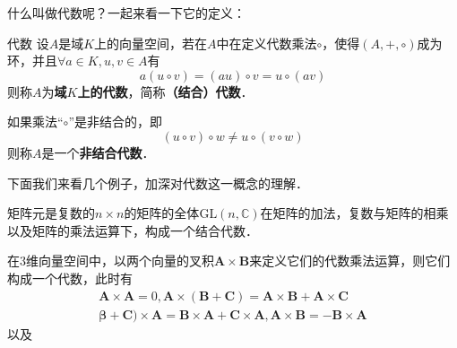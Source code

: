 

什么叫做代数呢？一起来看一下它的定义：
\begin{definition}{代数}
设$A$是域$K$上的向量空间，若在$A$中在定义代数乘法$\circ$，使得$(A,+,\circ)$成为环，并且$\forall a\in K, u, v\in A$有
\begin{equation}
a(u \circ v)=(a u) \circ v=u{\circ}(a v)
\end{equation}
则称$A$为\textbf{域$K$上的代数}，简称\textbf{（结合）代数}．

如果乘法“$\circ$”是非结合的，即
\begin{equation}
\left(u {\circ} v\right) \circ w \neq u{\circ}\left(v{\circ} w\right)
\end{equation}
则称$A$是一个\textbf{非结合代数}．
\end{definition}

下面我们来看几个例子，加深对代数这一概念的理解．

\begin{example}{}
矩阵元是复数的$n\times n$的矩阵的全体$\mathrm{GL}(n, \mathbb C)$在矩阵的加法，复数与矩阵的相乘以及矩阵的乘法运算下，构成一个结合代数．
\end{example}

\begin{example}{}
在$3$维向量空间中，以两个向量的叉积$\mathbf A\times \mathbf B$来定义它们的代数乘法运算，则它们构成一个代数，此时有
\begin{equation}
\begin{array}{l}\mathbf{A} \times \mathbf{A}=0, \mathbf{A} \times(\mathbf{B}+\mathbf{C})=\mathbf{A} \times \mathbf{B}+\mathbf{A} \times \mathbf{C} \\ \mathbf{\beta}+\mathbf{C}) \times \mathbf{A}=\mathbf{B} \times \mathbf{A}+\mathbf{C} \times \mathbf{A}, \mathbf{A} \times \mathbf{B}=-\mathbf{B} \times \mathbf{A}\end{array}
\end{equation}
以及

\end{example}